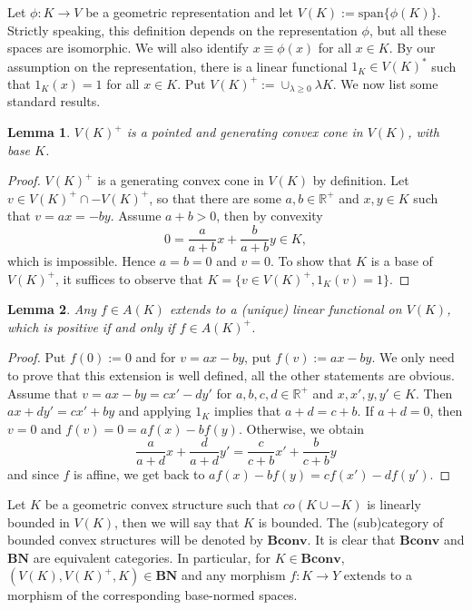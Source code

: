 \documentclass[12pt]{article}
\newtheorem{lemma}{Lemma}
\newcommand{\<}{\langle}
\newcommand{\ct}[1]{\mathbf{#1}}
\begin{document}
Let $\phi:K\to V$ be a geometric representation and let $V(K):=\mathrm{span}\{\phi(K)\}$. Strictly speaking, this definition depends on the representation $\phi$, but all
 these  spaces  are isomorphic. We will also identify $x\equiv \phi(x)$ for all $x\in K$. By our assumption on the representation, there is a linear functional $1_K\in V(K)^*$ such that 
 $1_K(x)=1$ for all $x\in K$. Put $V(K)^+:=\cup_{\lambda\ge 0} \lambda K$. We now list some standard results.

\begin{lemma} %
$V(K)^+$ is a pointed and generating convex cone in $V(K)$, with base $K$.

\end{lemma}

\begin{proof} $V(K)^+$ is a generating convex cone in $V(K)$ by definition. Let $v\in V(K)^+\cap -V(K)^+$, so that there are some $a,b\in \mathbb R^+$ and $x,y\in K$ such that $v=ax=-by$. Assume $a+b>0$, then by convexity 
\[
0=\frac a{a+b}x+\frac b{a+b}y\in K,
\]
 which is impossible. Hence $a=b=0$ and $v=0$. To show that $K$ is a base of $V(K)^+$, it suffices to observe that $K=\{v\in V(K)^+, 1_K(v)=1\}$.


\end{proof}



\begin{lemma}\label{lemma:extension} Any $f\in A(K)$ extends to a (unique) linear functional on $V(K)$, which is positive if and only if $f\in A(K)^+$.

\end{lemma}

\begin{proof} Put $f(0):=0$ and for $v=ax-by$, put $f(v):=ax-by$. We only need to prove that this extension is well defined, all the other  statements are obvious. Assume that $v=ax-by=cx'-dy'$ for $a,b,c,d\in \mathbb R^+$ and $x,x',y,y'\in K$. Then $ax+dy'=cx'+by$ and applying $1_K$ implies that $a+d=c+b$.
 If $a+d=0$, then $v=0$ and $f(v)=0=af(x)-bf(y)$. Otherwise, we obtain 
 \[
\frac a{a+d}x+ \frac d{a+d}y'=\frac c{c+b} x'+\frac b{c+b} y
 \]
and since $f$ is affine, we get back to $af(x)-bf(y)=cf(x')-df(y')$. 
\end{proof}






Let $K$ be a geometric convex structure such that $co(K\cup -K)$ is linearly bounded in $V(K)$, then we will say that $K$ is bounded.
 The (sub)category of  bounded convex structures will be denoted by $\ct{Bconv}$. It is clear that $\ct{Bconv}$ and $\ct{BN}$ are equivalent categories. In particular,
for $K\in \ct{Bconv}$, $(V(K),V(K)^+,K)\in \ct{BN}$ and any morphism $f:K\to Y$ extends to a morphism of the corresponding base-normed spaces. 
\end{document}
